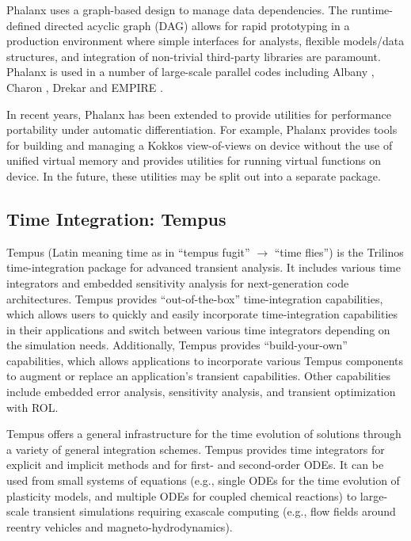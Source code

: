 Phalanx uses a graph-based design to manage data dependencies. The runtime-defined directed acyclic graph (DAG) allows for rapid prototyping in a production environment where simple interfaces for analysts, flexible models/data structures, and integration of non-trivial third-party libraries are paramount. Phalanx is used in a number of large-scale parallel codes including Albany \cite{Salinger2016}, Charon \cite{CharonUsersManual2020}, Drekar \cite{Crockatt2022,Miller2019,Shadid2016mhd} and EMPIRE \cite{BettencourtBrownEtAl2021_EmpirePic}.

In recent years, Phalanx has been extended to provide utilities for performance portability under automatic differentiation. For example, Phalanx provides tools for building and managing a Kokkos view-of-views on device without the use of unified virtual memory and provides utilities for running virtual functions on device. In the future, these utilities may be split out into a separate package.

\subsection{Time Integration: Tempus}
Tempus (Latin meaning time as in ``tempus fugit'' $\rightarrow$ ``time flies'') is the Trilinos time-integration package for advanced transient
analysis.  It includes various time integrators and embedded
sensitivity analysis for next-generation code architectures.  Tempus
provides “out-of-the-box” time-integration capabilities, which
allows users to quickly and easily incorporate time-integration
capabilities in their applications and switch between various time
integrators depending on the simulation needs.  Additionally, Tempus
provides “build-your-own” capabilities, which allows applications
to incorporate various Tempus components to augment or replace
an application's transient capabilities. Other capabilities include
embedded error analysis, sensitivity analysis, and transient optimization
with ROL.

Tempus offers a general infrastructure for the time evolution of
solutions through a variety of general integration schemes.  Tempus
provides time integrators for explicit and implicit methods and for
first- and second-order ODEs.  It can be used from small systems of
equations (e.g., single ODEs for the time evolution of plasticity
models, and multiple ODEs for coupled chemical reactions) to
large-scale transient simulations requiring exascale computing
(e.g., flow fields around reentry vehicles and magneto-hydrodynamics).

